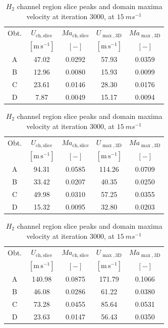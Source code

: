 \begin{table}[H]
\centering
\small
\setlength{\tabcolsep}{5pt}
\begin{tabular}{@{}ccccc@{}}
\toprule
 Obt. & $U_{\mathrm{ch,slice}}$ & $Ma_{\mathrm{ch,slice}}$ & $U_{\max,\mathrm{3D}}$ & $Ma_{\max,\mathrm{3D}}$\\
 & $[\mathrm{m\,s^{-1}}]$ & $[-]$ & $[\mathrm{m\,s^{-1}}]$ & $[-]$\\
\midrule
 A & 47.02 & 0.0292 & 57.93 & 0.0359\\
 B & 12.96 & 0.0080 & 15.93 & 0.0099\\
 C & 23.61 & 0.0146 & 28.30 & 0.0176\\
 D & 7.87 & 0.0049 & 15.17 & 0.0094\\
\bottomrule
\end{tabular}
\caption{$H_2$ channel region slice peaks and domain maxima velocity at iteration 3000, at $5\ ms^{-1}$}
\label{tab:hydrogen_local_mach1}

\vspace{1cm}

\begin{tabular}{@{}ccccc@{}}
\toprule
 Obt. & $U_{\mathrm{ch,slice}}$ & $Ma_{\mathrm{ch,slice}}$ & $U_{\max,\mathrm{3D}}$ & $Ma_{\max,\mathrm{3D}}$\\
 & $[\mathrm{m\,s^{-1}}]$ & $[-]$ & $[\mathrm{m\,s^{-1}}]$ & $[-]$\\
\midrule
 A & 94.31 & 0.0585 & 114.26 & 0.0709\\
 B & 33.42 & 0.0207 & 40.35 & 0.0250\\
 C & 49.98 & 0.0310 & 57.25 & 0.0355\\
 D & 15.32 & 0.0095 & 32.80 & 0.0203\\
\bottomrule
\end{tabular}
\caption{$H_2$ channel region slice peaks and domain maxima velocity at iteration 3000, at $10\ ms^{-1}$}
\label{tab:hydrogen_local_mach2}

\vspace{1cm}

\begin{tabular}{@{}ccccc@{}}
\toprule
 Obt. & $U_{\mathrm{ch,slice}}$ & $Ma_{\mathrm{ch,slice}}$ & $U_{\max,\mathrm{3D}}$ & $Ma_{\max,\mathrm{3D}}$\\
 & $[\mathrm{m\,s^{-1}}]$ & $[-]$ & $[\mathrm{m\,s^{-1}}]$ & $[-]$\\
\midrule
 A & 140.98 & 0.0875 & 171.79 & 0.1066\\
 B & 46.08 & 0.0286 & 61.22 & 0.0380\\
 C & 73.28 & 0.0455 & 85.64 & 0.0531\\
 D & 23.63 & 0.0147 & 56.43 & 0.0350\\
\bottomrule
\end{tabular}
\caption{$H_2$ channel region slice peaks and domain maxima velocity at iteration 3000, at $15\ ms^{-1}$}
\label{tab:hydrogen_local_mach3}


\end{table}


